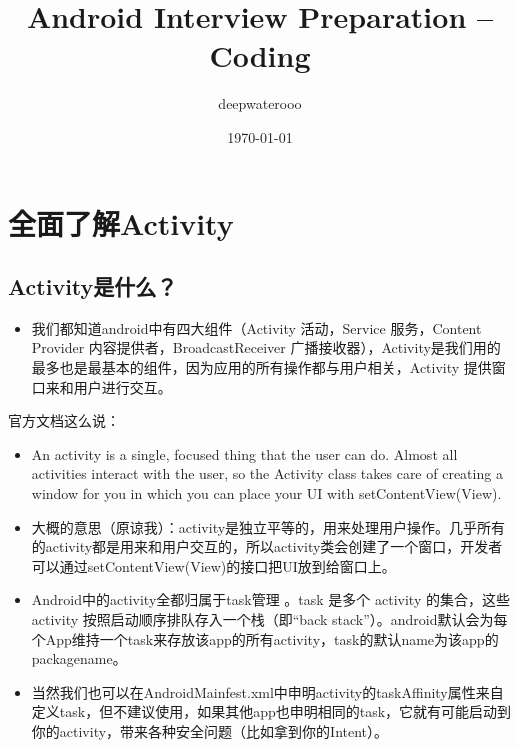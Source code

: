 \documentclass[9pt, b5paper]{article}
\author{deepwaterooo}
\date{\today}
\title{Android Interview Preparation -- Coding}
\begin{document}
\maketitle
\tableofcontents


\section{全面了解Activity}
\label{sec-1}
\subsection{Activity是什么？}
\label{sec-1-1}
\begin{itemize}
\item 我们都知道android中有四大组件（Activity 活动，Service 服务，Content Provider 内容提供者，BroadcastReceiver 广播接收器），Activity是我们用的最多也是最基本的组件，因为应用的所有操作都与用户相关，Activity 提供窗口来和用户进行交互。
\end{itemize}
官方文档这么说：
\begin{itemize}
\item An activity is a single, focused thing that the user can do. Almost all activities interact with the user, so the Activity class takes care of creating a window for you in which you can place your UI with setContentView(View).
\item 大概的意思（原谅我）：activity是独立平等的，用来处理用户操作。几乎所有的activity都是用来和用户交互的，所以activity类会创建了一个窗口，开发者可以通过setContentView(View)的接口把UI放到给窗口上。
\item Android中的activity全都归属于task管理 。task 是多个 activity 的集合，这些 activity 按照启动顺序排队存入一个栈（即“back stack”）。android默认会为每个App维持一个task来存放该app的所有activity，task的默认name为该app的packagename。
\item 当然我们也可以在AndroidMainfest.xml中申明activity的taskAffinity属性来自定义task，但不建议使用，如果其他app也申明相同的task，它就有可能启动到你的activity，带来各种安全问题（比如拿到你的Intent）。
\end{itemize}
\end{document}
